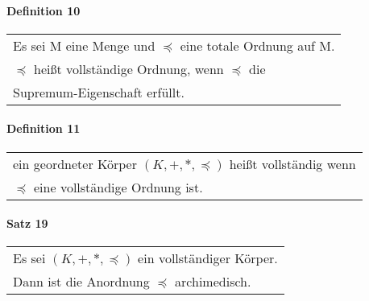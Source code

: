 \documentclass[a4paper]{scrartcl}
\begin{document}
\paragraph{Definition 10}
\begin{tabbing}
\begin{tabular}{l}
Es sei M eine Menge und $ \preceq $ eine totale Ordnung auf M.\\
$\preceq$ heißt vollständige Ordnung, wenn $\preceq$ die\\
Supremum-Eigenschaft erfüllt.
\end{tabular}
\end{tabbing}

\paragraph{Definition 11}
\begin{tabbing}
\begin{tabular}{l}
ein geordneter Körper $(K,+,*,\preceq )$ heißt vollständig wenn\\
$\preceq$ eine vollständige Ordnung ist.
\end{tabular}
\end{tabbing}

\paragraph{Satz 19}
\begin{tabbing}
\begin{tabular}{l}
Es sei $(K,+,*,\preceq)$ ein vollständiger Körper.\\
Dann ist die Anordnung $\preceq$ archimedisch.
\end{tabular}
\end{tabbing}
\end{document}
